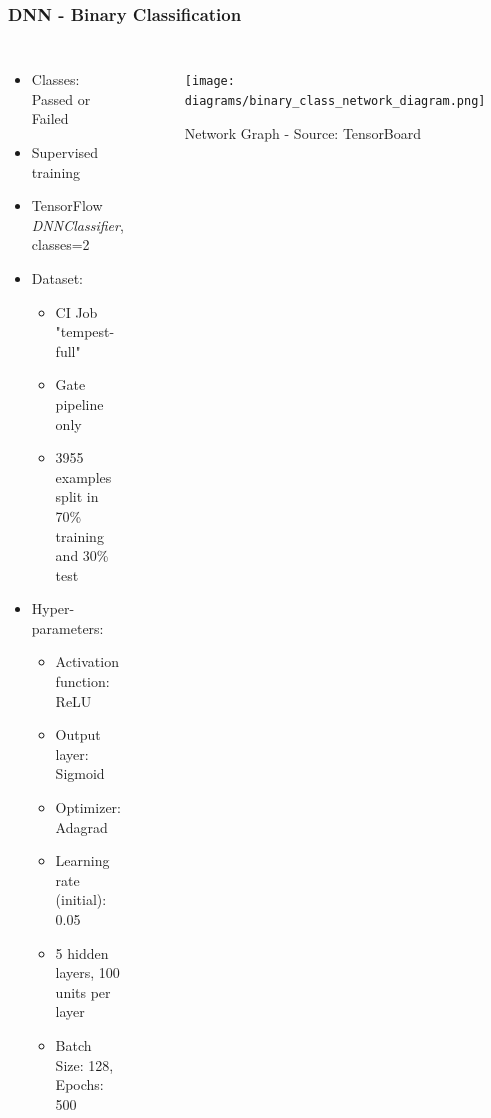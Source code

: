 \documentclass[aspectratio=169,11pt,hyperref={colorlinks=true}]{beamer}
\begin{document}
\begin{frame}
    \frametitle{DNN - Binary Classification}
    \begin{columns}
        \begin{itemize}
            \item{Classes: Passed or Failed}
            \item{Supervised training}
            \item{TensorFlow \emph{DNNClassifier}, classes=2}
            \item{Dataset:}
            \begin{itemize}
              \item{CI Job "tempest-full"}
              \item{Gate pipeline only}
              \item{3955 examples split in 70\% training and 30\% test}
            \end{itemize}
            \item{Hyper-parameters:}
            \begin{itemize}
              \item{Activation function: ReLU}
              \item{Output layer: Sigmoid}
              \item{Optimizer: Adagrad}
              \item{Learning rate (initial): 0.05}
              \item{5 hidden layers, 100 units per layer}
              \item{Batch Size: 128, Epochs: 500}
            \end{itemize}
        \end{itemize}
        \begin{figure}
        \begin{center}
          \texttt{[image: diagrams/binary\_class\_network\_diagram.png]}
             \caption{Network Graph - Source: TensorBoard}
        \end{center}
        \end{figure}
    \end{columns}
\end{frame}
\end{document}
